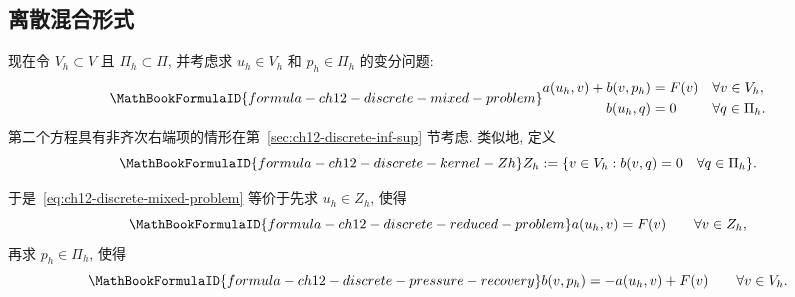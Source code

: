 \subsection{离散混合形式}
\label{sec:ch12-discrete-mixed-formulation}
\setcounter{thmcount}{0}
\setcounter{equation}{0}

现在令 $V_h\subset V$ 且 $\Pi_h\subset\Pi$, 并考虑求 $u_h\in V_h$ 和 $p_h\in\Pi_h$ 的变分问题:
\begin{equation}
\MathBookFormulaID{formula-ch12-discrete-mixed-problem}
\label{eq:ch12-discrete-mixed-problem}
\begin{aligned}
a(u_h,v)+b(v,p_h)&=F(v)&&\forall v\in V_h,\\
b(u_h,q)&=0&&\forall q\in\Pi_h.
\end{aligned}
\end{equation}
第二个方程具有非齐次右端项的情形在第~\ref{sec:ch12-discrete-inf-sup} 节考虑. 类似地, 定义
\begin{equation}
\MathBookFormulaID{formula-ch12-discrete-kernel-Zh}
\label{eq:ch12-discrete-kernel-Zh}
Z_h:=\{v\in V_h:b(v,q)=0\quad\forall q\in\Pi_h\}.
\end{equation}

于是~\eqref{eq:ch12-discrete-mixed-problem} 等价于先求 $u_h\in Z_h$, 使得
\begin{equation}
\MathBookFormulaID{formula-ch12-discrete-reduced-problem}
\label{eq:ch12-discrete-reduced-problem}
a(u_h,v)=F(v)\qquad\forall v\in Z_h,
\end{equation}
再求 $p_h\in\Pi_h$, 使得
\begin{equation}
\MathBookFormulaID{formula-ch12-discrete-pressure-recovery}
\label{eq:ch12-discrete-pressure-recovery}
b(v,p_h)=-a(u_h,v)+F(v)\qquad\forall v\in V_h.
\end{equation}


